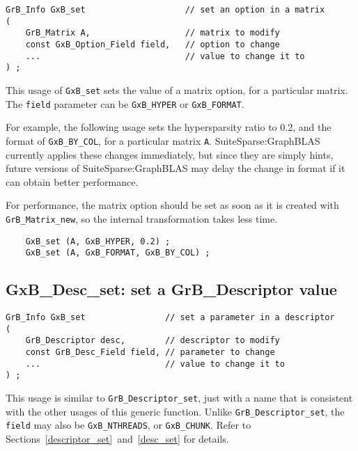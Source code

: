 \documentclass[12pt]{article}
\begin{document}
\begin{mdframed}[userdefinedwidth=6in]
{\footnotesize
\begin{verbatim}
GrB_Info GxB_set                    // set an option in a matrix
(
    GrB_Matrix A,                   // matrix to modify
    const GxB_Option_Field field,   // option to change
    ...                             // value to change it to
) ;
\end{verbatim} } \end{mdframed}

This usage of \verb'GxB_set' sets the value of a matrix option, for a
particular matrix.
The \verb'field' parameter can be \verb'GxB_HYPER' or \verb'GxB_FORMAT'.

For example, the following usage sets the hypersparsity
ratio to 0.2, and the format of \verb'GxB_BY_COL', for a particular matrix
\verb'A'.  SuiteSparse:GraphBLAS currently applies these changes immediately,
but since they are simply hints, future versions of SuiteSparse:GraphBLAS may
delay the change in format if it can obtain better performance.

For performance, the matrix option should be set as soon as it is created with
\verb'GrB_Matrix_new', so the internal transformation takes less time.

{\footnotesize
\begin{verbatim}
    GxB_set (A, GxB_HYPER, 0.2) ;
    GxB_set (A, GxB_FORMAT, GxB_BY_COL) ;
\end{verbatim} }

\newpage
\subsection{{\sf GxB\_Desc\_set:} set a {\sf GrB\_Descriptor} value}
\label{gxbset}

\begin{mdframed}[userdefinedwidth=6in]
{\footnotesize
\begin{verbatim}
GrB_Info GxB_set                // set a parameter in a descriptor
(
    GrB_Descriptor desc,        // descriptor to modify
    const GrB_Desc_Field field, // parameter to change
    ...                         // value to change it to
) ;
\end{verbatim} } \end{mdframed}

This usage is similar to \verb'GrB_Descriptor_set', just with a name that is
consistent with the other usages of this generic function.  Unlike
\verb'GrB_Descriptor_set', the \verb'field' may also be \verb'GxB_NTHREADS', or
\verb'GxB_CHUNK'.  Refer to Sections~\ref{descriptor_set}~and~\ref{desc_set}
for details.
\end{document}
